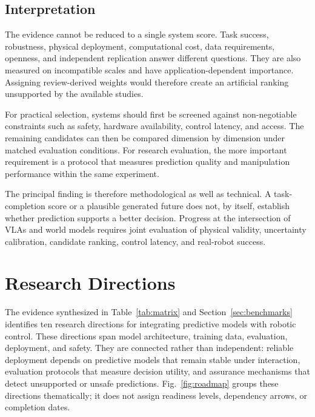 \documentclass{ieeeaccess}
\begin{document}
\subsection{Interpretation}

The evidence cannot be reduced to a single system score. Task success, robustness, physical deployment, computational cost, data requirements, openness, and independent replication answer different questions. They are also measured on incompatible scales and have application-dependent importance. Assigning review-derived weights would therefore create an artificial ranking unsupported by the available studies.

For practical selection, systems should first be screened against non-negotiable constraints such as safety, hardware availability, control latency, and access. The remaining candidates can then be compared dimension by dimension under matched evaluation conditions. For research evaluation, the more important requirement is a protocol that measures prediction quality and manipulation performance within the same experiment.

The principal finding is therefore methodological as well as technical. \textcolor[RGB]{104,48,148}{A task-completion score or a plausible generated future does not, by itself, establish whether prediction supports a better decision.} Progress at the intersection of VLAs and world models requires joint evaluation of physical validity, uncertainty calibration, candidate ranking, control latency, and real-robot success.




\section{Research Directions}
\label{sec:roadmap}

The evidence synthesized in Table~\ref{tab:matrix} and Section~\ref{sec:benchmarks} identifies ten research directions for integrating predictive models with robotic control. These directions span model architecture, training data, evaluation, deployment, and safety. They are connected rather than independent: reliable deployment depends on predictive models that remain stable under interaction, evaluation protocols that measure decision utility, and assurance mechanisms that detect unsupported or unsafe predictions. \textcolor[RGB]{104,48,148}{Fig.~\ref{fig:roadmap} groups these directions thematically; it does not assign readiness levels, dependency arrows, or completion dates.}
\end{document}
